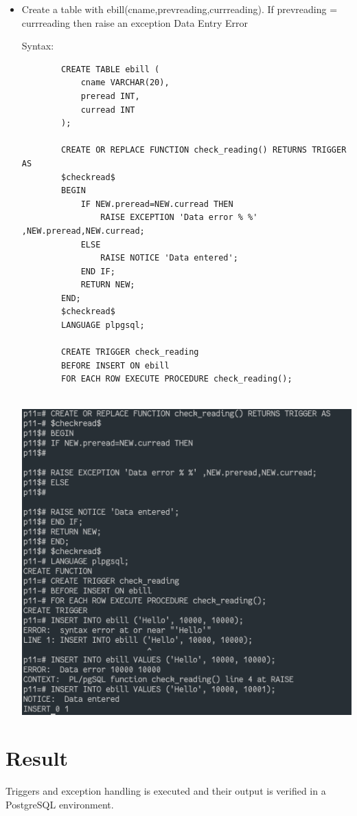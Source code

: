 \documentclass[13pt,oneside]{book}
\begin{document}
\begin{itemize}
	
	\item
	Create a table with ebill(cname,prevreading,currreading). If prevreading
= currreading then raise an exception Data Entry Error
	 
	Syntax:
	\begin{verbatim}
		CREATE TABLE ebill (
			cname VARCHAR(20),
			preread INT,
			curread INT
		);
		
		CREATE OR REPLACE FUNCTION check_reading() RETURNS TRIGGER AS
		$checkread$
		BEGIN
			IF NEW.preread=NEW.curread THEN
				RAISE EXCEPTION 'Data error % %' ,NEW.preread,NEW.curread;
			ELSE
				RAISE NOTICE 'Data entered';
			END IF;
			RETURN NEW;
		END;
		$checkread$
		LANGUAGE plpgsql;
		
		CREATE TRIGGER check_reading
		BEFORE INSERT ON ebill
		FOR EACH ROW EXECUTE PROCEDURE check_reading();
	
	\end{verbatim}
	\includegraphics[]{img/p11/ss7.png}
	

	
\end{itemize}
\section*{Result}
	Triggers and exception handling is executed and their output
	is verified in a PostgreSQL environment.
\end{document}
